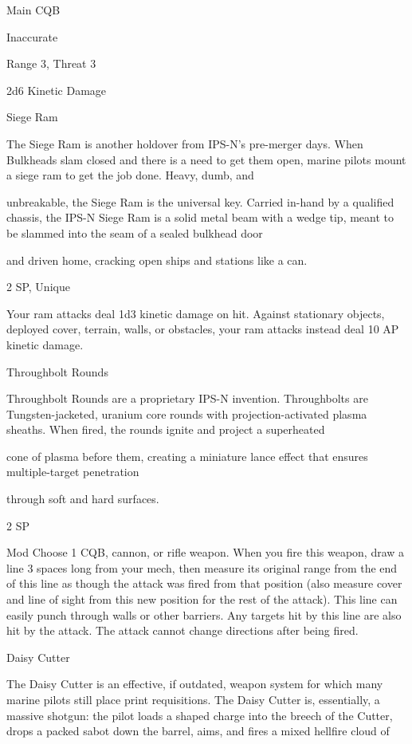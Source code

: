 Main CQB

Inaccurate

Range 3, Threat 3

2d6 Kinetic Damage


Siege Ram

The Siege Ram is another holdover from IPS-N’s pre-merger days. When Bulkheads slam closed and there
is a need to get them open, marine pilots mount a siege ram to get the job done. Heavy, dumb, and

unbreakable, the Siege Ram is the universal key. Carried in-hand by a qualified chassis, the IPS-N Siege
Ram is a solid metal beam with a wedge tip, meant to be slammed into the seam of a sealed bulkhead door

and driven home, cracking open ships and stations like a can.

2 SP, Unique





Your ram attacks deal 1d3 kinetic damage on hit. Against stationary objects, deployed cover,
terrain, walls, or obstacles, your ram attacks instead deal 10 AP kinetic damage.


Throughbolt Rounds

Throughbolt Rounds are a proprietary IPS-N invention. Throughbolts are Tungsten-jacketed, uranium core
rounds with projection-activated plasma sheaths. When fired, the rounds ignite and project a superheated

cone of plasma before them, creating a miniature lance effect that ensures multiple-target penetration

through soft and hard surfaces.

2 SP

Mod
Choose 1 CQB, cannon, or rifle weapon. When you fire this weapon, draw a line 3 spaces long
from your mech, then measure its original range from the end of this line as though the attack
was fired from that position (also measure cover and line of sight from this new position for the
rest of the attack). This line can easily punch through walls or other barriers. Any targets hit by
this line are also hit by the attack. The attack cannot change directions after being fired.


Daisy Cutter

The Daisy Cutter is an effective, if outdated, weapon system for which many marine pilots still place print
requisitions. The Daisy Cutter is, essentially, a massive shotgun: the pilot loads a shaped charge into the
breech of the Cutter, drops a packed sabot down the barrel, aims, and fires a mixed hellfire cloud of

